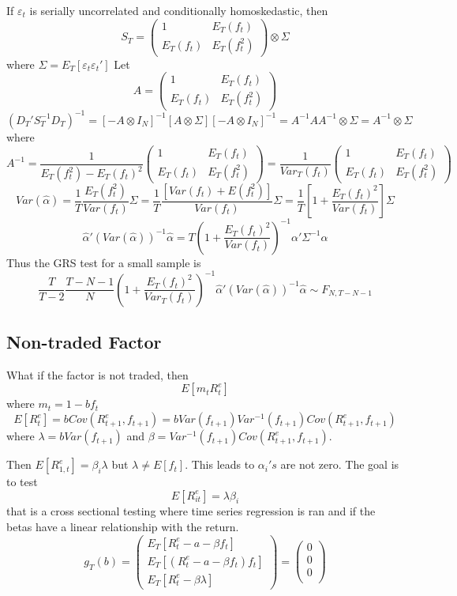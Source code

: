 \documentclass[11pt, a4paper, oneside]{article}
\theoremstyle{definition}
\theoremstyle{proposition}
\theoremstyle{corollary}
\theoremstyle{lemma}
\theoremstyle{theorem}
\begin{document}
If $\varepsilon_t$ is serially uncorrelated and conditionally homoskedastic, then 
$$S_T =\begin{pmatrix} 1 & E_T(f_t) \\ E_T(f_t) & E_T(f_t^2) \end{pmatrix} \otimes \Sigma$$
where $\Sigma = E_T[\varepsilon_t\varepsilon_t']$
Let $$A = \begin{pmatrix} 1 & E_T(f_t) \\ E_T(f_t) & E_T(f_t^2) \end{pmatrix}$$
$$(D_T'S_T^{-1}D_T)^{-1}=[-A \otimes I_N]^{-1}[A\otimes \Sigma][-A \otimes I_N]^{-1} =A^{-1}AA^{-1}\otimes \Sigma = A^{-1} \otimes \Sigma $$
where $$A^{-1} = \frac{1}{E_T(f_t^2)-E_T(f_t)^2}  \begin{pmatrix} 1 & E_T(f_t) \\ E_T(f_t) & E_T(f_t^2) \end{pmatrix} = \frac{1}{Var_T(f_t)}\begin{pmatrix} 1 & E_T(f_t) \\ E_T(f_t) & E_T(f_t^2) \end{pmatrix}$$
$$Var(\hat{\alpha}) = \frac{1}{T}\frac{E_T(f_t^2)}{Var(f_t)}\Sigma = \frac{1}{T} \frac{[Var(f_t) + E(f_t^2)]}{Var(f_t)} \Sigma = \frac{1}{T}\left[1 + \frac{E_T(f_t)^2}{Var(f_t)} \right]\Sigma$$
$$\hat{\alpha}'(Var(\hat{\alpha}))^{-1}\hat{\alpha} = T\left(1 + \frac{E_T(f_t)^2}{Var(f_t)}\right)^{-1}\alpha'\Sigma^{-1}\alpha$$
Thus the GRS test for a small sample is 
$$\frac{T}{T-2}\frac{T-N-1}{N}\left(1 + \frac{E_T(f_t)^2}{Var_T(f_t)}\right)^{-1}\hat{\alpha}'(Var(\hat{\alpha}))^{-1}\hat{\alpha} \sim F_{N, T-N-1}$$

\subsection{Non-traded Factor}

What if the factor is not traded, then
$$E[m_tR_t^e]$$
where $m_t = 1 - bf_t$
$$E[R_t^e] = b Cov(R_{t+1}^e, f_{t+1}) = b Var(f_{t+1})Var^{-1}(f_{t+1})Cov(R_{t+1}^e, f_{t+1})$$
where $\lambda = b Var(f_{t+1})$ and $\beta = Var^{-1}(f_{t+1})Cov(R_{t+1}^e, f_{t+1})$. 

Then $E[R_{1, t}^e] = \beta_i \lambda$ but $\lambda \neq E[f_t]$. This leads to $\alpha_i's$ are not zero. The goal is to test
$$E[R_{it}^e] =\lambda \beta_i$$ that is a cross sectional testing where time series regression is ran and if the betas have a linear relationship with the return. 
$$g_T(b) = \begin{pmatrix}
E_T[R_t^e - a - \beta f_t] \\
E_T[(R_t^e - a - \beta f_t)f_t] \\
E_T[R_t^e - \beta \lambda]
\end{pmatrix} = \begin{pmatrix} 
0  \\
0 \\
0 \\
\end{pmatrix}$$
\end{document}

